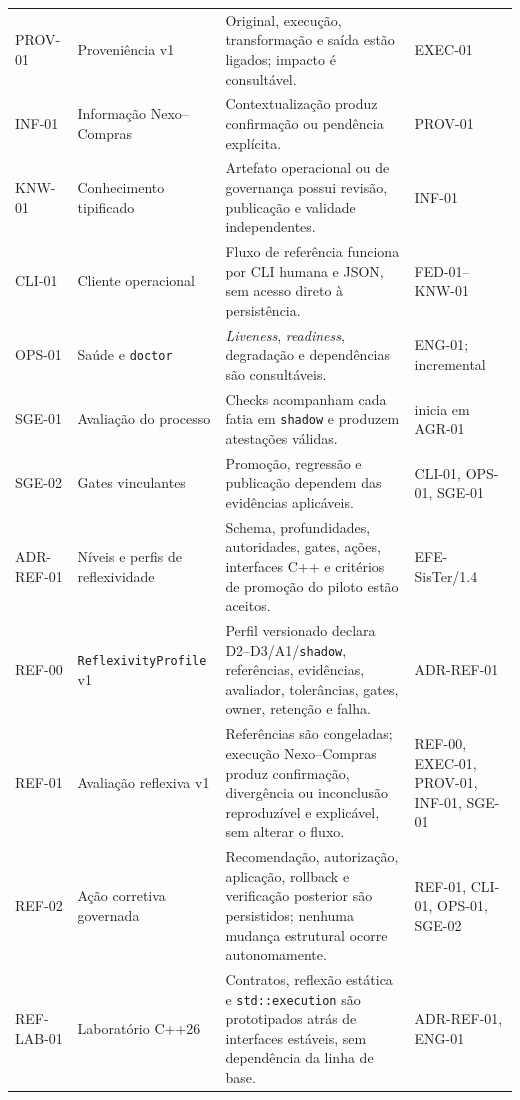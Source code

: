 \documentclass[11pt,a4paper,oneside]{article}
\begin{document}
\begin{longtable}{P{1.5cm}P{3.6cm}P{5.7cm}P{2.7cm}}
PROV-01 & Proveniência v1 & Original, execução, transformação e saída estão ligados; impacto é consultável. & EXEC-01 \\
INF-01 & Informação Nexo--Compras & Contextualização produz confirmação ou pendência explícita. & PROV-01 \\
KNW-01 & Conhecimento tipificado & Artefato operacional ou de governança possui revisão, publicação e validade independentes. & INF-01 \\
CLI-01 & Cliente operacional & Fluxo de referência funciona por CLI humana e JSON, sem acesso direto à persistência. & FED-01--KNW-01 \\
OPS-01 & Saúde e \texttt{doctor} & \textit{Liveness}, \textit{readiness}, degradação e dependências são consultáveis. & ENG-01; incremental \\
SGE-01 & Avaliação do processo & Checks acompanham cada fatia em \texttt{shadow} e produzem atestações válidas. & inicia em AGR-01 \\
SGE-02 & Gates vinculantes & Promoção, regressão e publicação dependem das evidências aplicáveis. & CLI-01, OPS-01, SGE-01 \\
ADR-REF-01 & Níveis e perfis de reflexividade & Schema, profundidades, autoridades, gates, ações, interfaces C++ e critérios de promoção do piloto estão aceitos. & EFE-SisTer/1.4 \\
REF-00 & \texttt{ReflexivityProfile} v1 & Perfil versionado declara D2--D3/A1/\texttt{shadow}, referências, evidências, avaliador, tolerâncias, gates, owner, retenção e falha. & ADR-REF-01 \\
REF-01 & Avaliação reflexiva v1 & Referências são congeladas; execução Nexo--Compras produz confirmação, divergência ou inconclusão reproduzível e explicável, sem alterar o fluxo. & REF-00, EXEC-01, PROV-01, INF-01, SGE-01 \\
REF-02 & Ação corretiva governada & Recomendação, autorização, aplicação, rollback e verificação posterior são persistidos; nenhuma mudança estrutural ocorre autonomamente. & REF-01, CLI-01, OPS-01, SGE-02 \\
REF-LAB-01 & Laboratório C++26 & Contratos, reflexão estática e \texttt{std::execution} são prototipados atrás de interfaces estáveis, sem dependência da linha de base. & ADR-REF-01, ENG-01 \\
\bottomrule
\end{longtable}
\end{document}

